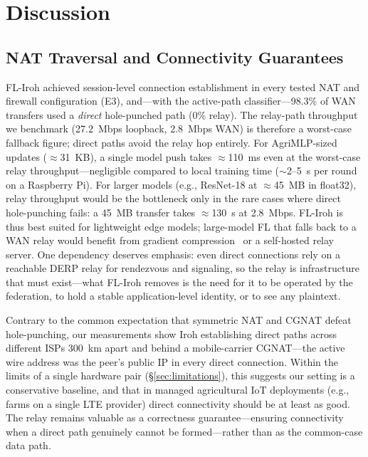 ﻿\documentclass[journal]{IEEEtran}
\begin{document}
\section{Discussion}
\label{sec:discussion}

\subsection{NAT Traversal and Connectivity Guarantees}

FL-Iroh achieved session-level connection establishment in every tested NAT and firewall configuration (E3), and---with the active-path classifier---98.3\% of WAN transfers used a \emph{direct} hole-punched path (0\% relay). The relay-path throughput we benchmark (27.2~Mbps loopback, 2.8~Mbps WAN) is therefore a worst-case fallback figure; direct paths avoid the relay hop entirely. For AgriMLP-sized updates ($\approx$31~KB), a single model push takes $\approx$110~ms even at the worst-case relay throughput---negligible compared to local training time ($\sim$2--5~s per round on a Raspberry Pi). For larger models (e.g., ResNet-18 at $\approx$45~MB in float32), relay throughput would be the bottleneck only in the rare cases where direct hole-punching fails: a 45~MB transfer takes $\approx$130~s at 2.8~Mbps. FL-Iroh is thus best suited for lightweight edge models; large-model FL that falls back to a WAN relay would benefit from gradient compression~\cite{konecny2016} or a self-hosted relay server. One dependency deserves emphasis: even direct connections rely on a reachable DERP relay for rendezvous and signaling, so the relay is infrastructure that must exist---what FL-Iroh removes is the need for it to be operated by the federation, to hold a stable application-level identity, or to see any plaintext.

Contrary to the common expectation that symmetric NAT and CGNAT defeat hole-punching, our measurements show Iroh establishing direct paths across different ISPs 300~km apart and behind a mobile-carrier CGNAT---the active wire address was the peer's public IP in every direct connection. Within the limits of a single hardware pair (\S\ref{sec:limitations}), this suggests our setting is a conservative baseline, and that in managed agricultural IoT deployments (e.g., farms on a single LTE provider) direct connectivity should be at least as good. The relay remains valuable as a correctness guarantee---ensuring connectivity when a direct path genuinely cannot be formed---rather than as the common-case data path.
\end{document}
